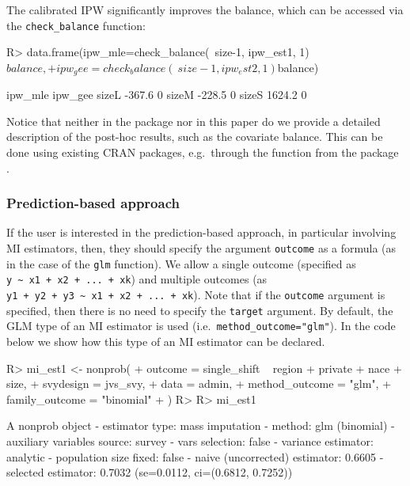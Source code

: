 \documentclass[
]{jss}
\begin{document}
The calibrated IPW significantly improves the balance, which can be
accessed via the \texttt{check\_balance} function:

\begin{CodeChunk}
\begin{CodeInput}
R> data.frame(ipw_mle=check_balance(~size-1, ipw_est1, 1)$balance,
+            ipw_gee=check_balance(~size-1, ipw_est2, 1)$balance)
\end{CodeInput}
\begin{CodeOutput}
      ipw_mle ipw_gee
sizeL  -367.6       0
sizeM  -228.5       0
sizeS  1624.2       0
\end{CodeOutput}
\end{CodeChunk}

Notice that neither in the package nor in this paper do we provide a
detailed description of the post-hoc results, such as the covariate
balance. This can be done using existing CRAN packages, e.g.~through the
 function from the  package \citep{cobalt}.

\subsubsection{Prediction-based
approach}\label{prediction-based-approach}

If the user is interested in the prediction-based approach, in
particular involving MI estimators, then, they should specify the
argument \texttt{outcome} as a formula (as in the case of the
\texttt{glm} function). We allow a single outcome (specified as
\texttt{y\ \textasciitilde{}\ x1\ +\ x2\ +\ ...\ +\ xk}) and multiple
outcomes (as
\texttt{y1\ +\ y2\ +\ y3\ \textasciitilde{}\ x1\ +\ x2\ +\ ...\ +\ xk}).
Note that if the \texttt{outcome} argument is specified, then there is
no need to specify the \texttt{target} argument. By default, the GLM
type of an MI estimator is used (i.e.~\texttt{method\_outcome="glm"}).
In the code below we show how this type of an MI estimator can be
declared.

\begin{CodeChunk}
\begin{CodeInput}
R> mi_est1 <- nonprob(
+   outcome = single_shift ~ region + private + nace + size,
+   svydesign = jvs_svy,
+   data = admin,
+   method_outcome = "glm",
+   family_outcome = "binomial"
+ )
R> 
R> mi_est1
\end{CodeInput}
\begin{CodeOutput}
A nonprob object
 - estimator type: mass imputation
 - method: glm (binomial)
 - auxiliary variables source: survey
 - vars selection: false
 - variance estimator: analytic
 - population size fixed: false
 - naive (uncorrected) estimator: 0.6605
 - selected estimator: 0.7032 (se=0.0112, ci=(0.6812, 0.7252))
\end{CodeOutput}
\end{CodeChunk}
\end{document}
